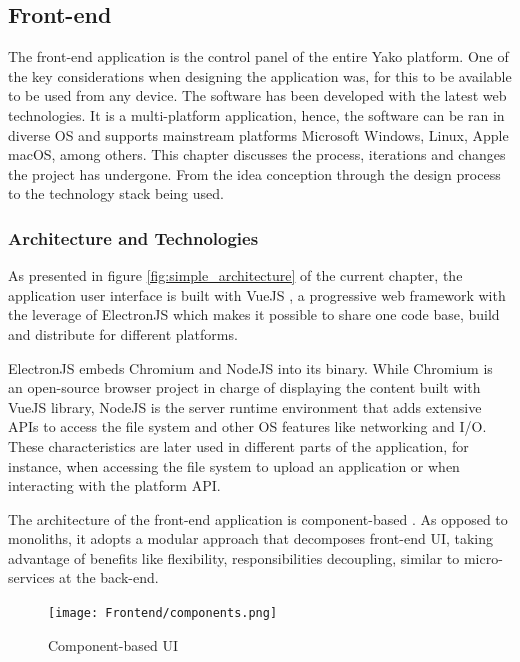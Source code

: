 \subsection{Front-end}
    The front-end application is the control panel of the entire Yako platform. One of the key considerations when designing the application was, for this to be available to be used from any device. The software has been developed with the latest web technologies. It is a multi-platform application, hence, the software can be ran in diverse OS and supports mainstream platforms Microsoft Windows, Linux, Apple macOS, among others. This chapter discusses the process, iterations and changes the project has undergone. From the idea conception through the design process to the technology stack being used.
    
    \subsubsection{Architecture and Technologies}
        As presented in figure \ref{fig:simple_architecture} of the current chapter, the application user interface is built with VueJS \cite{vuejs_what_nodate}, a progressive web framework with the leverage of ElectronJS \cite{openjs_foundation_electron_nodate} which makes it possible to share one code base, build and distribute for different platforms.
        
        ElectronJS embeds Chromium and NodeJS into its binary. While Chromium is an open-source browser project in charge of displaying the content built with VueJS library, NodeJS is the server runtime environment that adds extensive APIs to access the file system and other OS features like networking and I/O. These characteristics are later used in different parts of the application, for instance, when accessing the file system to upload an application or when interacting with the platform API.
        
            The architecture of the front-end application is component-based \cite{dhaduk_component-driven_2021}. As opposed to monoliths, it adopts a modular approach that decomposes front-end UI, taking advantage of benefits like flexibility, responsibilities decoupling, similar to micro-services at the back-end.
        
            \begin{figure}[H]
                \centering
                \texttt{[image: Frontend/components.png]}
                \caption{Component-based UI}
                \label{fig:vue_components}
            \end{figure}
            

